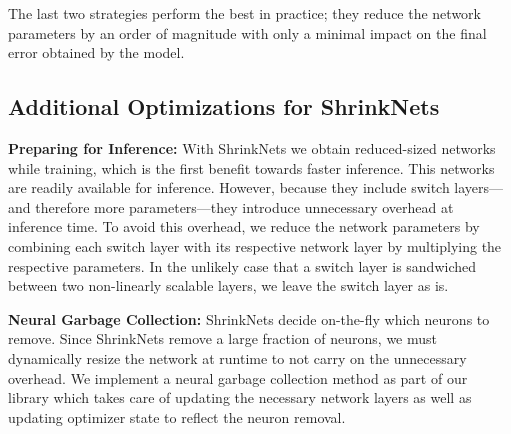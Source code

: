 The last two strategies perform the best in practice; they reduce the network
parameters by an order of magnitude with only a minimal impact on the final
error obtained by the model.


\subsection{Additional Optimizations for ShrinkNets}

\noindent\textbf{Preparing for Inference: } With ShrinkNets we obtain
reduced-sized networks while training, which is the first benefit towards faster
inference. This networks are readily available for inference. However, because
they include switch layers---and therefore more parameters---they introduce
unnecessary overhead at inference time. To avoid this overhead, we reduce the
network parameters by combining each switch layer with its respective network
layer by multiplying the respective parameters.  In the unlikely case that a switch
layer is sandwiched between two non-linearly scalable layers, we leave the
switch layer as is.

\noindent\textbf{Neural Garbage Collection: }ShrinkNets decide on-the-fly which
neurons to remove. Since ShrinkNets remove a large fraction of neurons, we must
dynamically resize the network at runtime to not carry on the 
unnecessary overhead. We implement a neural garbage collection method as part of
our library which takes care of updating the necessary network layers as well as
updating optimizer state to reflect the neuron removal. 




